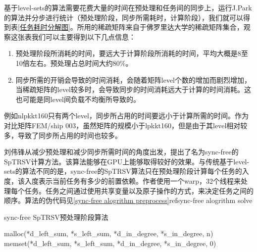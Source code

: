 基于level-sets的算法需要花费大量的时间在预处理和任务间的同步上，运行J.Park的算法并分步进行统计（预处理阶段，同步所需耗时，计算阶段），我们就可以得到表\ref{任务耗时分解图}。所用的稀疏矩阵来自于佛罗里达大学的稀疏矩阵集合\cite{davis2011university}，观察这张表我们可以主要得到以下几点信息：
\begin{enumerate} \setlength{\itemsep}{0pt}
\item 预处理阶段所消耗的时间，要远大于计算阶段所消耗的时间，平均大概是8至10倍左右。预处理占总时间大约80\%。
\item 同步所需的开销会导致的时间消耗，会随着矩阵level个数的增加而剧烈增加，当稀疏矩阵的level较多时，会导致同步的时间消耗远大于计算的时间消耗。这也可能是同level间负载不均衡所导致的。
\end{enumerate}
例如nlpkkt160只有两个level，同步所占用的时间要远小于计算所需的时间。作为对比矩阵FEM/ship 003，虽然矩阵的规模小于lpkkt160，但是由于其level相对较多，导致了同步所占用的时间也较多。

刘伟锋从减少预处理和减少同步所需时间的角度出发，提出了名为sync-free的SpTRSV计算方法\cite{liuSyncFree2016}。该算法能够在GPU上能够取得较好的效果。与传统基于level-sets的算法不同的是，sync-free的SpTRSV算法只在预处理阶段计算每个任务的入度，该入度表示当前任务有多少的前置依赖。作者使用一个warp，32个线程来处理每个任务。任务之间通过使用共享变量以及原子操作的方式，来决定任务之间的顺序。算法的伪代码见\ref{sync-free alogrithm preprocess}ref{sync-free alogrithm solve}

\begin{algorithm}[htbp]
    \caption{sync-free SpTRSV预处理阶段算法}
    \label{sync-free alogrithm preprocess}
    malloc(*d\_left\_sum, *s\_left\_sum, *d\_in\_degree, *s\_in\_degree, n)\;
    memset(*d\_left\_sum, *s\_left\_sum, *d\_in\_degree, *s\_in\_degree, 0)\;
\end{algorithm}

